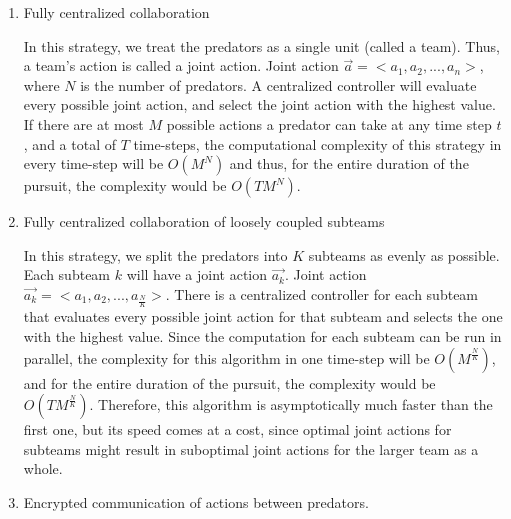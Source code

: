 \documentclass[11pt]{article}
\begin{document}
\begin{enumerate}[leftmargin=0.25cm]
	\item Fully centralized collaboration
	
	In this strategy, we treat the predators as a single unit (called a team). Thus, a team's action is called a joint action. Joint action $\vec{a} = <a_1, a_2, ..., a_n>$, where $N$ is the number of predators. A centralized controller will evaluate every possible joint action, and select the joint action with the highest value. If there are at most $M$ possible actions a predator can take at any time step $t$, and a total of $T$ time-steps, the computational complexity of this strategy in every time-step will be $O(M^N)$ and thus, for the entire duration of the pursuit, the complexity would be $O(TM^N)$.
	
	\item Fully centralized collaboration of loosely coupled subteams
	
	In this strategy, we split the predators into $K$ subteams as evenly as possible. Each subteam $k$ will have a joint action $\vec{a_k}$. Joint action $\vec{a_k} = <a_1, a_2, ..., a_{\frac{N}{K}}>$. There is a centralized controller for each subteam that evaluates every possible joint action for that subteam and selects the one with the highest value. Since the computation for each subteam can be run in parallel, the complexity for this algorithm in one time-step will be $O(M^{\frac{N}{K}})$, and for the entire duration of the pursuit, the complexity would be $O(TM^{\frac{N}{K}})$. Therefore, this algorithm is asymptotically much faster than the first one, but its speed comes at a cost, since optimal joint actions for subteams might result in suboptimal joint actions for the larger team as a whole. 
	
	\item Encrypted communication of actions between predators.
	

\end{enumerate}
\end{document}
